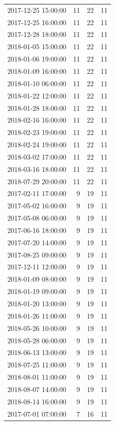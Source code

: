 \begin{tabular}{lrrr}
2017-12-25 15:00:00 & 11 & 22 & 11 \\
2017-12-25 16:00:00 & 11 & 22 & 11 \\
2017-12-28 18:00:00 & 11 & 22 & 11 \\
2018-01-05 15:00:00 & 11 & 22 & 11 \\
2018-01-06 19:00:00 & 11 & 22 & 11 \\
2018-01-09 16:00:00 & 11 & 22 & 11 \\
2018-01-10 06:00:00 & 11 & 22 & 11 \\
2018-01-22 12:00:00 & 11 & 22 & 11 \\
2018-01-28 18:00:00 & 11 & 22 & 11 \\
2018-02-16 16:00:00 & 11 & 22 & 11 \\
2018-02-23 19:00:00 & 11 & 22 & 11 \\
2018-02-24 19:00:00 & 11 & 22 & 11 \\
2018-03-02 17:00:00 & 11 & 22 & 11 \\
2018-03-16 18:00:00 & 11 & 22 & 11 \\
2018-07-29 20:00:00 & 11 & 22 & 11 \\
2017-02-11 17:00:00 & 9 & 19 & 11 \\
2017-05-02 16:00:00 & 9 & 19 & 11 \\
2017-05-08 06:00:00 & 9 & 19 & 11 \\
2017-06-16 18:00:00 & 9 & 19 & 11 \\
2017-07-20 14:00:00 & 9 & 19 & 11 \\
2017-08-25 09:00:00 & 9 & 19 & 11 \\
2017-12-11 12:00:00 & 9 & 19 & 11 \\
2018-01-09 08:00:00 & 9 & 19 & 11 \\
2018-01-19 09:00:00 & 9 & 19 & 11 \\
2018-01-20 13:00:00 & 9 & 19 & 11 \\
2018-01-26 11:00:00 & 9 & 19 & 11 \\
2018-05-26 10:00:00 & 9 & 19 & 11 \\
2018-05-28 06:00:00 & 9 & 19 & 11 \\
2018-06-13 13:00:00 & 9 & 19 & 11 \\
2018-07-25 11:00:00 & 9 & 19 & 11 \\
2018-08-01 11:00:00 & 9 & 19 & 11 \\
2018-08-07 14:00:00 & 9 & 19 & 11 \\
2018-08-14 16:00:00 & 9 & 19 & 11 \\
2017-07-01 07:00:00 & 7 & 16 & 11 \\

\end{tabular}
